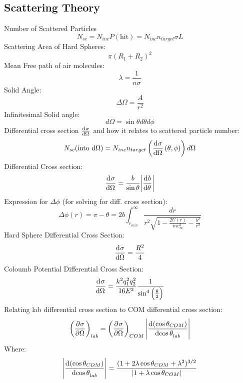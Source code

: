 \documentclass[../PHYS306Notes.tex]{subfiles}
\begin{document}
\subsection{Scattering Theory}
Number of Scattered Particles
\begin{equation}
    N_{sc} = N_{inc}P(\text{hit}) = N_{inc}n_{target}\sigma L
\end{equation}
Scattering Area of Hard Spheres:
\begin{equation}
    \pi(R_1 + R_2)^2
\end{equation}
Mean Free path of air molecules:
\begin{equation}
    \lambda = \frac{1}{n\sigma}
\end{equation}
Solid Angle:
\begin{equation}
    \Delta \Omega = \frac{A}{r^2}
\end{equation}
Infinitesimal Solid angle:
\begin{equation}
    d\Omega = \sin\theta d\theta d\phi
\end{equation}
Differential cross section $\od{\sigma}{\Omega}$ and how it relates to scattered particle number:
\begin{equation}
    N_{sc}(\text{into d$\Omega$}) = N_{inc}n_{target}\left(\dod{\sigma}{\Omega}(\theta, \phi)\right)d\Omega
\end{equation}
Differential Cross section:
\begin{equation}
    \dod{\sigma}{\Omega} = \frac{b}{\sin\theta}\abs{\dod{b}{\theta}}
\end{equation}
Expression for $\Delta \phi$ (for solving for diff. cross section):
\begin{equation}
    \Delta \phi(r) = \pi - \theta =  2b\int_{r_{min}}^\infty \frac{dr}{r^2\sqrt{1 - \frac{2U(r)}{mv^2_\infty} - \frac{b^2}{r^2}}}
\end{equation}
Hard Sphere Differential Cross Section:
\begin{equation}
    \dod{\sigma}{\Omega} = \frac{R^2}{4}
\end{equation}
Coloumb Potential Differential Cross Section:
\begin{equation}
    \dod{\sigma}{\Omega} = \frac{k^2q_1^2q_2^2}{16E^2}\frac{1}{\sin^4\left(\frac{\theta}{2}\right)}
\end{equation}
Relating lab differential cross section to COM differential cross section:
\begin{equation}
    \left(\dpd{\sigma}{\Omega}\right)_{lab} = \left(\dpd{\sigma}{\Omega}\right)_{COM}\abs{\dod{(\cos\theta_{COM})}{\cos\theta_{lab}}}
\end{equation}
Where:
\begin{equation}
    \abs{\dod{(\cos\theta_{COM})}{\cos\theta_{lab}}} = \frac{(1 + 2\lambda \cos\theta_{COM} + \lambda^2)^{3/2}}{\abs{1 + \lambda \cos\theta_{COM}}}
\end{equation}
\end{document}
